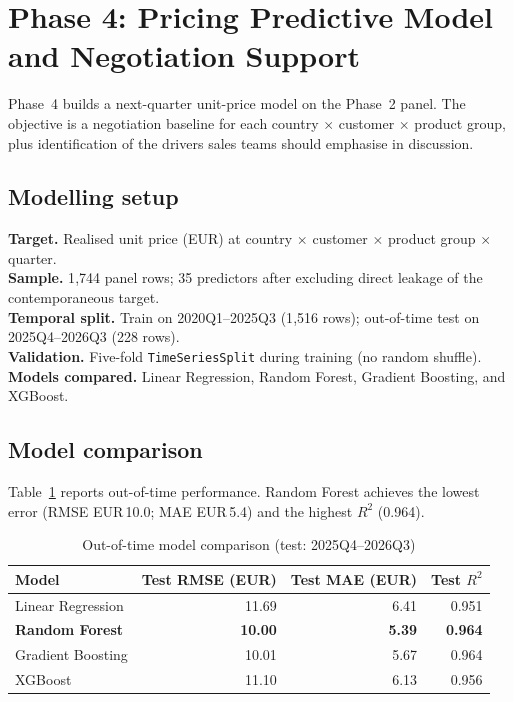 \documentclass{article}
\begin{document}
\clearpage

\section{Phase 4: Pricing Predictive Model and Negotiation Support}
\label{sec:phase4}

Phase~4 builds a next-quarter unit-price model on the Phase~2 panel. The objective is a negotiation baseline for each country $\times$ customer $\times$ product group, plus identification of the drivers sales teams should emphasise in discussion.

\subsection{Modelling setup}

\textbf{Target.} Realised unit price (EUR) at country $\times$ customer $\times$ product group $\times$ quarter.\\
\textbf{Sample.} 1{,}744 panel rows; 35 predictors after excluding direct leakage of the contemporaneous target.\\
\textbf{Temporal split.} Train on 2020Q1--2025Q3 (1{,}516 rows); out-of-time test on 2025Q4--2026Q3 (228 rows).\\
\textbf{Validation.} Five-fold \texttt{TimeSeriesSplit} during training (no random shuffle).\\
\textbf{Models compared.} Linear Regression, Random Forest, Gradient Boosting, and XGBoost.

\subsection{Model comparison}

Table~\ref{tab:phase4_models} reports out-of-time performance. Random Forest achieves the lowest error (RMSE EUR\,10.0; MAE EUR\,5.4) and the highest $R^2$ (0.964).

\begin{table}[H]
\centering
\small
\begin{tabular}{@{}lrrr@{}}
\toprule
\textbf{Model} & \textbf{Test RMSE (EUR)} & \textbf{Test MAE (EUR)} & \textbf{Test $R^2$} \\
\midrule
Linear Regression & 11.69 & 6.41 & 0.951 \\
\textbf{Random Forest} & \textbf{10.00} & \textbf{5.39} & \textbf{0.964} \\
Gradient Boosting & 10.01 & 5.67 & 0.964 \\
XGBoost & 11.10 & 6.13 & 0.956 \\
\bottomrule
\end{tabular}
\caption{Out-of-time model comparison (test: 2025Q4--2026Q3)}
\label{tab:phase4_models}
\end{table}
\end{document}
